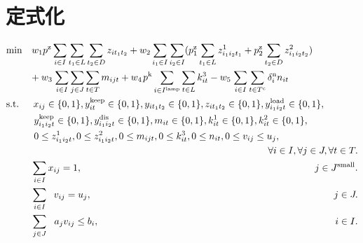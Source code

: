 \section{定式化}
\begin{center}
\begin{align}
&\textrm{min} \hspace{1.0em} {w_1 p^{\rm{z}} \sum_{i \in I} \sum_{t_1 \in L}  \sum_{t_2 \in D} {z_{it_1t_2}}}
+ {w_2 \sum_{i_1 \in I} \sum_{i_2 \in I} (p_1^{\rm{z}} \sum_{t_1 \in L} {z_{i_1i_2t_1}^1} + p_2^{\rm{z}} \sum_{t_2 \in D} {z_{i_1i_2t_2}^2} )} \notag \\
&\hspace{2.45em} + {w_3 \hspace{0.1em} \sum_{i \in I} \sum_{j\in J} \sum_{t \in T}  {m_{ijt}} }
+ {w_4 \hspace{0.1em} p^{\rm{k}} \sum_{i \in I^{\rm{lamp}}} \sum_{t \in L} {k_{it}^3}}
- {w_5 \hspace{0.1em} \sum_{i \in I} \sum_{t \in T^{\rm{c}}} \delta_i^{\rm{n}} {n_{it}}} \\
&\textrm{s.t.} \hspace{1.5em} x_{ij} \in \{ 0 , 1 \}, {y_{it}^{\rm{keep}}} \in \{ 0 , 1 \}, {y_{it_1t_2}} \in \{ 0 , 1 \}, z_{it_1t_2} \in \{ 0 , 1 \},  {y_{i_1i_2t}^{\rm{load}}} \in \{ 0 , 1 \}, \notag \\
&\hspace{2.9em}  {y_{i_1i_2t}^{\rm{keep}}} \in \{ 0 , 1 \}, {y_{i_1i_2t}^{\rm{dis}}} \in \{ 0 , 1 \}, {m_{it}} \in \{ 0 , 1 \}, {k^1_{it}} \in \{ 0 , 1 \}, {k^2_{it}} \in \{ 0 , 1 \}, \notag \\
&\hspace{2.9em} 0 \leq z_{i_1i_2t}^1, 0 \leq z_{i_1i_2t}^2, 0 \leq m_{ijt}, 0 \leq k^3_{it}, 0 \leq n_{it}, 0 \leq v_{ij} \leq u_j, \notag \\
&\hspace{2.9em}  \hspace{24.48em} \forall i \in I, \forall j \in J, \forall t \in T. \\
&\hspace{2.6em} \sum_{i \in I} x_{ij} = 1, \hspace{24.34em} j \in J^{\rm{small}}. \\
&\hspace{2.6em} \sum_{i \in I} {\hspace{0.6em}v_{ij}} = u_j, \hspace{25.33em} j \in J. \\
&\hspace{2.6em} \sum_{j \in J} {\hspace{0.65em}a_{j}}{v_{ij}} \leq {b_{i}}, \hspace{24.7em} i \in I. \\

\end{align}
\end{center}
